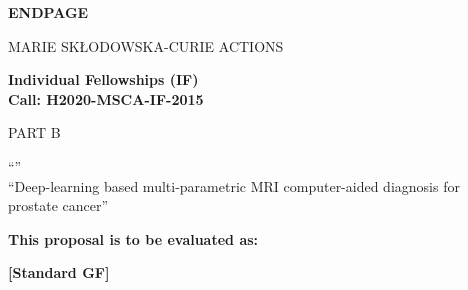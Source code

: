 \newpage
\vspace{15mm}
\begin{center}


        \Large{


        \textbf{ENDPAGE}

          \vspace{15mm}
          MARIE SK\L{}ODOWSKA-CURIE ACTIONS\\
          \vspace{1cm}

          \textbf{Individual Fellowships (IF)}\\
          \textbf{Call: H2020-MSCA-IF-2015}
          \vspace{2cm}

          PART B
          \vspace{2.5cm}

          ``\proposalAcronym''\\
          \vspace{1cm}
          ``Deep-learning based multi-parametric MRI computer-aided diagnosis for prostate cancer''
          \vspace{1cm}

          \textbf{This proposal is to be evaluated as:}
          \vspace{.5cm}

          \textbf{[Standard GF]}
        }

  \end{center}
\vspace{1cm}
